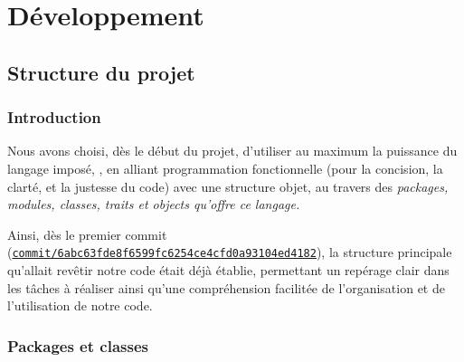 \documentclass[a4paper, 12pt]{report}
\newcommand{\tech}[1]{\sf{#1}}
\newcommand{\en}[1]{\it{#1}}
\begin{document}

\part{Développement}

    \chapter{Structure du projet} %
    
    \section{Introduction}

    Nous avons choisi, dès le début du projet, d'utiliser au maximum la puissance du langage imposé, \tech{Scala}, en alliant programmation fonctionnelle (pour la concision, la clarté, et la justesse du code) avec une structure objet, au travers des 
    \en{package}s, \en{module}s, \en{class}es, \en{trait}s et \en{object}s qu'offre ce langage.
    
    Ainsi, dès le premier commit (\href{https://gitlab.telecomnancy.univ-lorraine.fr/Projets_TOP/projet_top_a2/commit/6abc63fde8f6599fc6254ce4cfd0a93104ed4182}{\tt{commit/6abc63fde8f6599fc6254ce4cfd0a93104ed4182}}), la structure principale qu'allait revêtir notre code était déjà établie, permettant un repérage clair dans les tâches à réaliser ainsi qu'une compréhension facilitée de l'organisation et de l'utilisation de notre code.
    
    \section{Packages et classes}
    
\end{document}
